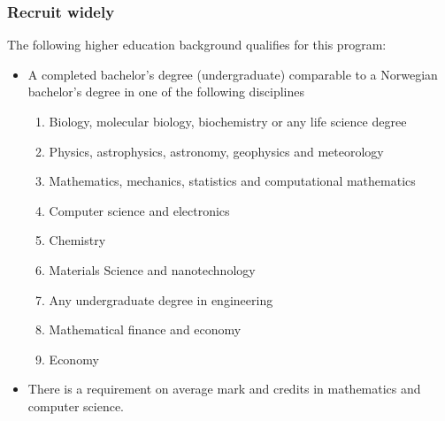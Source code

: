 \documentclass{beamer}
\begin{document}
\begin{frame}
\frametitle{Recruit widely}

\begin{block}{}
The following higher education background qualifies for this program:

\begin{itemize}
\item A completed bachelor's degree (undergraduate) comparable to a Norwegian bachelor's degree in one of the following disciplines
\begin{enumerate}

 \item Biology, molecular biology, biochemistry  or any life science degree

 \item Physics, astrophysics, astronomy, geophysics and meteorology

 \item Mathematics, mechanics, statistics and computational mathematics

 \item Computer science and electronics

 \item Chemistry

 \item Materials Science and nanotechnology

 \item Any undergraduate degree in engineering

 \item Mathematical finance and economy

 \item Economy

\end{enumerate}

\noindent
\item There is a requirement on average mark and credits in mathematics and computer science.
\end{itemize}

\noindent
\end{block}
\end{frame}
\end{document}
